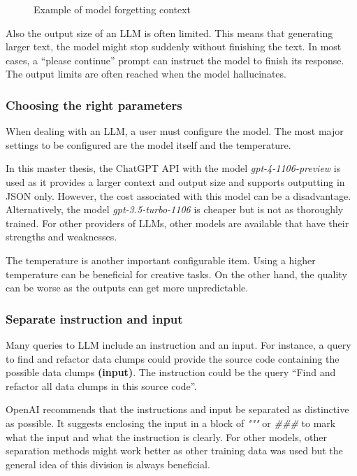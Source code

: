 \begin{figure}[ht!]
    \centering
    
    \caption{Example of model forgetting context}
    \label{fig:llm_loose_context}
\end{figure}

Also the output size of an \ac{LLM} is often limited. This means that generating larger text, the model might stop suddenly without finishing the text. In most cases, a \enquote{please continue} prompt can instruct the model to finish its response. The output limits are often reached when the model hallucinates. 
\subsubsection{Choosing the right parameters}
When dealing with an \ac{LLM}, a user must configure the model. The most major settings to be configured are the model itself and the temperature.

In this master thesis, the ChatGPT \ac{API} with the model \textit{gpt-4-1106-preview} is used as it provides a larger context  and output size and supports outputting in \ac{JSON} only. However, the cost associated with this model can be a disadvantage. Alternatively, the model \textit{gpt-3.5-turbo-1106} is cheaper but is not as thoroughly trained. For other providers of \acp{LLM}, other models are available that have their strengths and weaknesses.  

The temperature is another important configurable item. Using a higher temperature can be beneficial for creative tasks. On the other hand, the quality can be worse as the outputs can get more unpredictable. 




\subsubsection{Separate instruction and input}
Many queries to \ac{LLM} include an instruction and an input. For instance, a query to find and refactor data clumps could provide the source code containing the possible data clumps \textbf{(input)}. The instruction could be the query \enquote{Find and refactor all data clumps in this source code}. 

OpenAI recommends that the instructions and input be separated as distinctive as possible. It suggests enclosing the input in a block of \textit{"""} or \textit{\#\#\#} to mark what the input and what the instruction is clearly. For other models, other separation methods might work better as other training data was used but the general idea of this division is always beneficial. 

